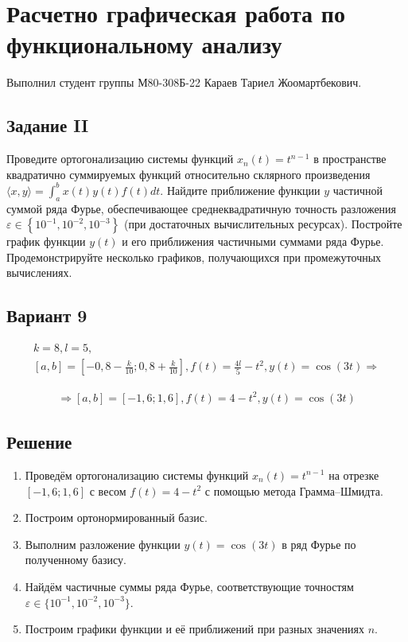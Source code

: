 \documentclass{article}
\begin{document}
\section*{Расчетно графическая работа по функциональному анализу}

Выполнил студент группы М80-308Б-22 Караев Тариел Жоомартбекович.

\subsection*{Задание II}
Проведите ортогонализацию системы функций $x_n(t)=t^{n-1}$ в пространстве квадратично суммируемых функций относительно склярного произведения $\langle x, y\rangle=\int_a^b x(t) y(t) f(t) d t$. Найдите приближение функции $y$ частичной суммой ряда Фурье, обеспечивающее среднеквадратичную точность разложения $\varepsilon \in\left\{10^{-1}, 10^{-2}, 10^{-3}\right\}$ (при достаточных вычислительных ресурсах). Постройте график функции $y(t)$ и его приближения частичными суммами ряда Фурье. Продемонстрируйте несколько графиков, получающихся при промежуточных вычислениях.

\subsection*{Вариант 9}

\begin{gather*}
    k = 8, l = 5, \\
    [a, b] = \left[-0,8 - \frac{k}{10}; 0,8+\frac{k}{10}\right],
    f(t) = \frac{4l}{5} - t^2,
    y(t)= \cos(3t) \Rightarrow
\end{gather*}

\begin{gather*}
    \Rightarrow [a, b] = \left[-1,6; 1,6\right], f(t) = 4 - t^2, y(t)=\cos(3t)
\end{gather*}


\subsection*{Решение}

\begin{enumerate}
    \item Проведём ортогонализацию системы функций \( x_n(t) = t^{n-1} \) на отрезке \([-1{,}6; 1{,}6]\) с весом \( f(t) = 4 - t^2 \) с помощью метода Грамма–Шмидта.
    \item Построим ортонормированный базис.
    \item Выполним разложение функции \( y(t) = \cos(3t) \) в ряд Фурье по полученному базису.
    \item Найдём частичные суммы ряда Фурье, соответствующие точностям \( \varepsilon \in \{10^{-1}, 10^{-2}, 10^{-3} \} \).
    \item Построим графики функции и её приближений при разных значениях \( n \).
\end{enumerate}
\end{document}
